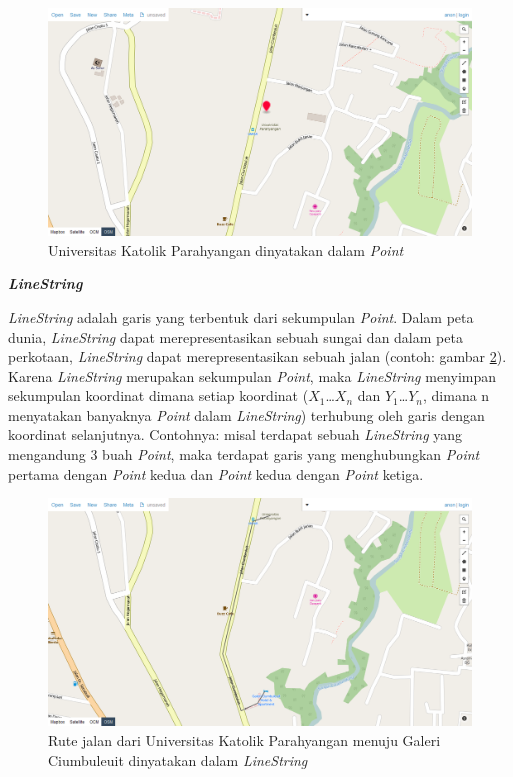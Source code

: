 \documentclass[a4paper,twoside]{article}
\begin{document}
\begin{enumerate}
\begin{itemize}
\begin{figure}[htbp]
	\centering
		\includegraphics[scale=0.35]{Gambar/2_point.png}
	\caption{Universitas Katolik Parahyangan dinyatakan dalam \textit{Point}\cite{geojson}}
	\label{fig:2_UNPAR}
\end{figure}

\textbf{\textit{LineString}}

\textit{LineString} adalah garis yang terbentuk dari sekumpulan \textit{Point}\cite{mysqlspatial}. Dalam peta dunia, \textit{LineString} dapat merepresentasikan sebuah sungai dan dalam peta perkotaan, \textit{LineString} dapat merepresentasikan sebuah jalan (contoh: gambar \ref{fig:2_linestring}). Karena \textit{LineString} merupakan sekumpulan \textit{Point}, maka \textit{LineString} menyimpan sekumpulan koordinat dimana setiap koordinat ($X_{1}$\ldots$X_{n}$ dan $Y_{1}$\ldots$Y_{n}$, dimana n menyatakan banyaknya \textit{Point} dalam \textit{LineString}) terhubung oleh garis dengan koordinat selanjutnya. Contohnya: misal terdapat sebuah \textit{LineString} yang mengandung 3 buah \textit{Point}, maka terdapat garis yang menghubungkan \textit{Point} pertama dengan \textit{Point} kedua dan \textit{Point} kedua dengan \textit{Point} ketiga.

\begin{figure}[htbp]
	\centering
		\includegraphics[scale=0.35]{Gambar/2_linestring.png}
	\caption{Rute jalan dari Universitas Katolik Parahyangan menuju Galeri Ciumbuleuit dinyatakan dalam \textit{LineString}\cite{geojson}}
	\label{fig:2_linestring}
\end{figure}


\end{itemize}
\end{enumerate}
\end{document}
